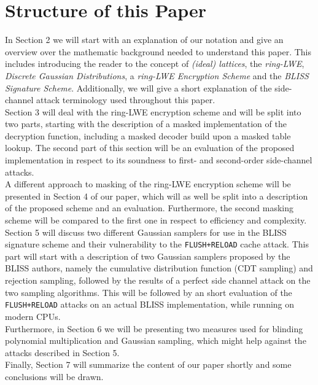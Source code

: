 \section{Structure of this Paper}
In Section 2 we will start with an explanation of our notation and give an overview over the mathematic background needed to understand this paper. This includes introducing the reader to the concept of \textit{(ideal) lattices}, the \textit{\ac{ring-LWE}}, \textit{Discrete Gaussian Distributions}, a \textit{\ac{ring-LWE} Encryption Scheme} and the \textit{BLISS Signature Scheme}. Additionally, we will give a short explanation of the side-channel attack terminology used throughout this paper.\\ 
Section 3 will deal with the ring-LWE encryption scheme and will be split into two parts, starting with the description of a masked implementation of the decryption function, including a masked decoder build upon a masked table lookup. The second part of this section will be an evaluation of the proposed implementation in respect to its soundness to first- and second-order side-channel attacks.\\ 
A different approach to masking of the \ac{ring-LWE} encryption scheme will be presented in Section 4 of our paper, which will as well be split into a description of the proposed scheme and an evaluation. Furthermore, the second masking scheme will be compared to the first one in respect to efficiency and complexity.\\
Section 5 will discuss two different Gaussian samplers for use in the BLISS signature scheme and their vulnerability to the \verb|FLUSH+RELOAD| cache attack. This part will start with a description of two Gaussian samplers proposed by the BLISS authors, namely the cumulative distribution function (CDT sampling) and rejection sampling, followed by the results of a perfect side channel attack on the two sampling algorithms. This will be followed by an short evaluation of the \verb|FLUSH+RELOAD| attacks on an actual BLISS implementation, while running on modern CPUs.\\
Furthermore, in Section 6 we will be presenting two measures used for blinding polynomial multiplication and Gaussian sampling, which might help against the attacks described in Section 5.\\
Finally, Section 7 will summarize the content of our paper shortly and some conclusions will be drawn.